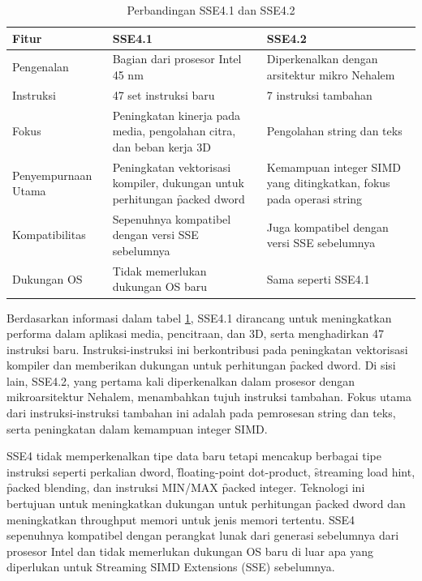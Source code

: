 \begin{table}[h]
	\centering
	\begin{tabular}{|p{3cm}|p{4.6cm}|p{4.6cm}|}
		\hline
		\textbf{Fitur}      & \textbf{SSE4.1}                                                               & \textbf{SSE4.2}                                                     \\ \hline
		Pengenalan          & Bagian dari prosesor Intel 45 nm                                              & Diperkenalkan dengan arsitektur mikro Nehalem                       \\ \hline
		Instruksi           & 47 set instruksi baru                                                         & 7 instruksi tambahan                                                \\ \hline
		Fokus               & Peningkatan kinerja pada media, pengolahan citra, dan beban kerja 3D          & Pengolahan string dan teks                                          \\ \hline
		Penyempurnaan Utama & Peningkatan vektorisasi kompiler, dukungan untuk perhitungan \f{packed dword} & Kemampuan integer SIMD yang ditingkatkan, fokus pada operasi string \\ \hline
		Kompatibilitas      & Sepenuhnya kompatibel dengan versi SSE sebelumnya                             & Juga kompatibel dengan versi SSE sebelumnya                         \\ \hline
		Dukungan OS         & Tidak memerlukan dukungan OS baru                                             & Sama seperti SSE4.1                                                 \\ \hline
	\end{tabular}
	\caption{Perbandingan SSE4.1 dan SSE4.2}
	\label{table:perbandingan_sse4}
\end{table}

Berdasarkan informasi dalam tabel \ref{table:perbandingan_sse4}, SSE4.1 dirancang untuk meningkatkan performa dalam aplikasi media, pencitraan, dan 3D, serta menghadirkan 47 instruksi baru. Instruksi-instruksi ini berkontribusi pada peningkatan vektorisasi kompiler dan memberikan dukungan untuk perhitungan \f{packed dword}. Di sisi lain, SSE4.2, yang pertama kali diperkenalkan dalam prosesor dengan mikroarsitektur Nehalem, menambahkan tujuh instruksi tambahan. Fokus utama dari instruksi-instruksi tambahan ini adalah pada pemrosesan string dan teks, serta peningkatan dalam kemampuan integer SIMD\cite{sse4reference}.

SSE4 tidak memperkenalkan tipe data baru tetapi mencakup berbagai tipe instruksi seperti perkalian dword, \f{floating-point dot-product}, \f{streaming load hint}, \f{packed blending}, dan instruksi MIN/MAX \f{packed integer}. Teknologi ini bertujuan untuk meningkatkan dukungan untuk perhitungan \f{packed dword} dan meningkatkan throughput memori untuk jenis memori tertentu. SSE4 sepenuhnya kompatibel dengan perangkat lunak dari generasi sebelumnya dari prosesor Intel dan tidak memerlukan dukungan OS baru di luar apa yang diperlukan untuk Streaming SIMD Extensions (SSE) sebelumnya\cite{sse4reference}.